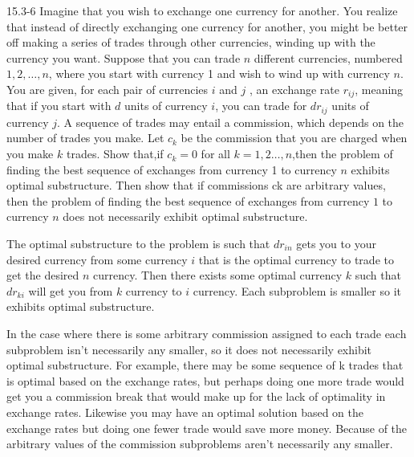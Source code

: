 \begin{problem}{15.3-6}
  Imagine that you wish to exchange one currency for another. You realize that instead of directly exchanging one
  currency for another, you might be better off making a series of trades through other currencies, winding up with the
  currency you want. Suppose that you can trade $n$ different currencies, numbered $1, 2, \ldots, n$, where you start
  with currency 1 and wish to wind up with currency $n$. You are given, for each pair of currencies $i$ and $j$ , an
  exchange rate $r_{ij}$, meaning that if you start with $d$ units of currency $i$, you can trade for $dr_{ij}$ units of
  currency $j$. A sequence of trades may entail a commission, which depends on the number of trades you make. Let $c_k$
  be the commission that you are charged when you make $k$ trades. Show that,if $c_k = 0$ for all $k = 1,2
  \dots,n$,then the problem of finding the best sequence of exchanges from currency 1 to currency $n$ exhibits optimal
  substructure. Then show that if commissions ck are arbitrary values, then the problem of finding the best sequence of
  exchanges from currency $1$ to currency $n$ does not necessarily exhibit optimal substructure.
  \begin{solution}
    The optimal substructure to the problem is such that $dr_{in}$ gets you to your desired currency from some currency
    $i$ that is the optimal currency to trade to get the desired $n$ currency. Then there exists some optimal currency
    $k$ such that $dr_{ki}$ will get you from $k$ currency to $i$ currency. Each subproblem is smaller so it exhibits
    optimal substructure.

    In the case where there is some arbitrary commission assigned to each trade each subproblem isn't necessarily any
    smaller, so it does not necessarily exhibit optimal substructure. For example, there may be some sequence of k
    trades that is optimal based on the exchange rates, but perhaps doing one more trade would get you a commission
    break that would make up for the lack of optimality in exchange rates. Likewise you may have an optimal solution
    based on the exchange rates but doing one fewer trade would save more money. Because of the arbitrary values of the
    commission subproblems aren't necessarily any smaller.
  \end{solution}
\end{problem}


